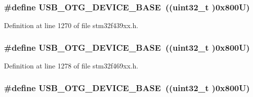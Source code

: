 \subsubsection[{\texorpdfstring{U\+S\+B\+\_\+\+O\+T\+G\+\_\+\+D\+E\+V\+I\+C\+E\+\_\+\+B\+A\+SE}{USB_OTG_DEVICE_BASE}}]{\setlength{\rightskip}{0pt plus 5cm}\#define U\+S\+B\+\_\+\+O\+T\+G\+\_\+\+D\+E\+V\+I\+C\+E\+\_\+\+B\+A\+SE~((uint32\+\_\+t )0x800\+U)}\hypertarget{group___peripheral__memory__map_ga4d74a337597a77b1fca978202b519a18}{}\label{group___peripheral__memory__map_ga4d74a337597a77b1fca978202b519a18}


Definition at line 1270 of file stm32f439xx.\+h.

\subsubsection[{\texorpdfstring{U\+S\+B\+\_\+\+O\+T\+G\+\_\+\+D\+E\+V\+I\+C\+E\+\_\+\+B\+A\+SE}{USB_OTG_DEVICE_BASE}}]{\setlength{\rightskip}{0pt plus 5cm}\#define U\+S\+B\+\_\+\+O\+T\+G\+\_\+\+D\+E\+V\+I\+C\+E\+\_\+\+B\+A\+SE~((uint32\+\_\+t )0x800\+U)}\hypertarget{group___peripheral__memory__map_ga4d74a337597a77b1fca978202b519a18}{}\label{group___peripheral__memory__map_ga4d74a337597a77b1fca978202b519a18}


Definition at line 1278 of file stm32f469xx.\+h.

\subsubsection[{\texorpdfstring{U\+S\+B\+\_\+\+O\+T\+G\+\_\+\+D\+E\+V\+I\+C\+E\+\_\+\+B\+A\+SE}{USB_OTG_DEVICE_BASE}}]{\setlength{\rightskip}{0pt plus 5cm}\#define U\+S\+B\+\_\+\+O\+T\+G\+\_\+\+D\+E\+V\+I\+C\+E\+\_\+\+B\+A\+SE~((uint32\+\_\+t )0x800\+U)}\hypertarget{group___peripheral__memory__map_ga4d74a337597a77b1fca978202b519a18}{}\label{group___peripheral__memory__map_ga4d74a337597a77b1fca978202b519a18}


